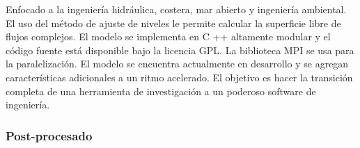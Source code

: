 \begin{enumerate}
Enfocado a la ingeniería hidráulica, costera, mar abierto y ingeniería
ambiental. El uso del método de ajuste de niveles le permite calcular la
superficie libre de flujos complejos. El modelo se implementa en C ++
altamente modular y el código fuente está disponible bajo la licencia
GPL. La biblioteca MPI se usa para la paralelización. El modelo se
encuentra actualmente en desarrollo y se agregan características
adicionales a un ritmo acelerado. El objetivo es hacer la transición
completa de una herramienta de investigación a un poderoso software de
ingeniería.
\end{enumerate}

\subsubsection{Post-procesado}\label{header-n292}

